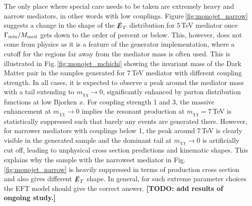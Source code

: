 The only place where special care needs to be taken are extremely heavy and narrow mediators, in other words with low couplings. Figure\,\ref{fig:monojet_narrow} suggests a change in the shape of the $\slashed{E}_T$ distribution for 5\,TeV mediator once $\Gamma_{\rm{min}}/M_{\rm{med}}$ gets down to the order of percent or below.
This, however, does not come from physics as it is a feature of the generator implementation, where a cutoff for the regions far away from the mediator mass is often used. This is illustrated in Fig.\,\ref{fig:monojet_mchichi} showing the invariant mass of the Dark Matter pair in the samples generated for 7\,TeV mediator with different coupling strength. In all cases, it is expected to observe a peak around the mediator mass with a tail extending to $m_{\bar{\chi}\chi}\rightarrow0$, significantly enhanced by parton distribution functions at low Bjorken $x$. For coupling strength 1 and 3, the massive enhancement at $m_{\bar{\chi}\chi}\rightarrow0$ implies the resonant production at $m_{\bar{\chi}\chi}=7$\,TeV is statistically suppressed such that barely any events are generated there. However, for narrower mediators with couplings below 1, the peak around 7\,TeV is clearly visible in the generated sample and the dominant tail at $m_{\bar{\chi}\chi}\rightarrow0$ is artificially cut off, leading to unphysical cross section predictions and kinematic shapes. This explains why the sample with the narrowest mediator in Fig.\,\ref{fig:monojet_narrow} is heavily suppressed in terms of production cross section and also gives different $\slashed{E}_T$ shape.
In general, for such extreme parameter choices
the EFT model should give the correct answer. \textbf{[TODO: add results of ongoing study.]}

%
%


